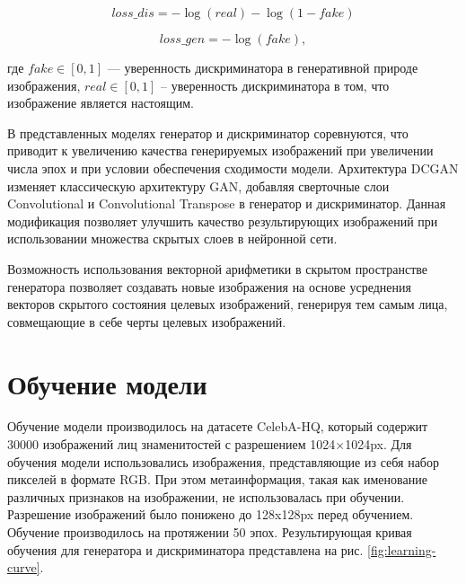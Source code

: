 \documentclass[60x84/16,8pt]{ittmm}
\begin{document}
\begin{equation}
  loss\_dis=-\log(real) - \log(1-fake)
  \label{eq:loss_dis}
\end{equation}

\begin{equation}
  loss\_gen=-\log(fake),
  \label{eq:loss_gen}
\end{equation}

где \(fake \in [0, 1]\) --- уверенность дискриминатора в генеративной природе изображения,
\(real \in [0, 1]\) -- уверенность дискриминатора в том, что изображение является настоящим.

В представленных моделях генератор и дискриминатор соревнуются, что приводит
к увеличению качества генерируемых изображений при увеличении числа эпох и
при условии обеспечения сходимости модели. Архитектура DCGAN изменяет классическую архитектуру GAN,
добавляя сверточные слои Convolutional и Convolutional Transpose в генератор и дискриминатор.
Данная модификация позволяет улучшить качество результирующих изображений при использовании
множества скрытых слоев в нейронной сети.

Возможность использования векторной арифметики
в скрытом пространстве генератора позволяет создавать новые изображения на основе усреднения
векторов скрытого состояния целевых изображений, генерируя тем самым лица,
совмещающие в себе черты целевых изображений.

\section{Обучение модели}
\label{sec:base-section}

Обучение модели производилось на датасете CelebA-HQ,
который содержит 30000 изображений лиц знаменитостей с разрешением 1024×1024px.
Для обучения модели использовались изображения,
представляющие из себя набор пикселей в формате RGB. При этом метаинформация, такая как именование
различных признаков на изображении, не использовалась при обучении.
Разрешение изображений было понижено до 128x128px перед обучением.
Обучение производилось на протяжении 50 эпох. Результирующая кривая
обучения для генератора и дискриминатора представлена на рис. \ref{fig:learning-curve}.
\end{document}

